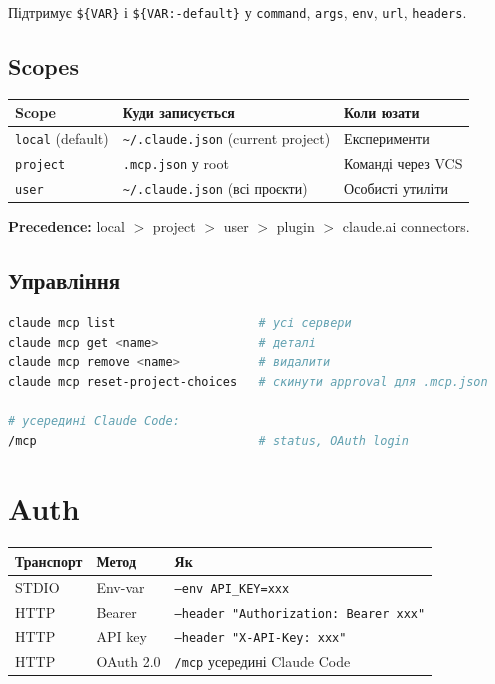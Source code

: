 \documentclass[11pt,a4paper]{article}
\begin{document}
Підтримує \texttt{\$\{VAR\}} і \texttt{\$\{VAR:-default\}} у \texttt{command}, \texttt{args}, \texttt{env}, \texttt{url}, \texttt{headers}.

\subsection{Scopes}

\begin{tabular}{lll}
\hline
\textbf{Scope} & \textbf{Куди записується} & \textbf{Коли юзати} \\
\hline
\texttt{local} (default) & \texttt{\textasciitilde/.claude.json} (current project) & Експерименти \\
\texttt{project} & \texttt{.mcp.json} у root & Команді через VCS \\
\texttt{user} & \texttt{\textasciitilde/.claude.json} (всі проєкти) & Особисті утиліти \\
\hline
\end{tabular}

\textbf{Precedence:} local $>$ project $>$ user $>$ plugin $>$ claude.ai connectors.

\subsection{Управління}

\begin{lstlisting}[language=bash]
claude mcp list                    # усі сервери
claude mcp get <name>              # деталі
claude mcp remove <name>           # видалити
claude mcp reset-project-choices   # скинути approval для .mcp.json

# усередині Claude Code:
/mcp                               # status, OAuth login
\end{lstlisting}

\section{Auth}

\begin{tabular}{lll}
\hline
\textbf{Транспорт} & \textbf{Метод} & \textbf{Як} \\
\hline
STDIO & Env-var & \texttt{--env API\_KEY=xxx} \\
HTTP & Bearer & \texttt{--header "Authorization: Bearer xxx"} \\
HTTP & API key & \texttt{--header "X-API-Key: xxx"} \\
HTTP & OAuth 2.0 & \texttt{/mcp} усередині Claude Code \\
\hline
\end{tabular}
\end{document}
